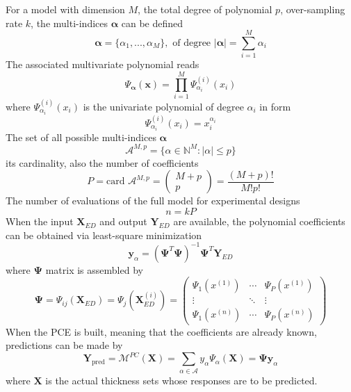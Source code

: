 For a model with dimension $M$, the total degree of polynomial $p$, over-sampling rate $k$, the multi-indices $\boldsymbol{\alpha}$ can be defined
\begin{equation}
    \boldsymbol{\alpha}=\{\alpha_1,...,\alpha_M\}, \text{ of degree }|\boldsymbol{\alpha}|=\sum_{i=1}^M \alpha_i  
\end{equation}
\noindent
The associated multivariate polynomial reads
\begin{equation}
    \Psi_{\boldsymbol{\alpha}}(\boldsymbol{x})=\prod_{i=1}^M\Psi_{\alpha_i}^{(i)}(x_i)
\end{equation}
\noindent
where $\Psi_{\alpha_i}^{(i)}(x_i)$ is the univariate polynomial of degree $\alpha_i$ in form
\begin{equation}
    \Psi_{\alpha_i}^{(i)}(x_i)=x_i^{\alpha_i}
\end{equation}
\noindent
The set of all possible multi-indices $\boldsymbol{\alpha}$
\begin{equation}
    \mathcal{A}^{M,p}=\{\alpha\in\mathbb{N}^M : |\alpha|\leq p\}
\end{equation}
its cardinality, also the number of coefficients
\begin{equation}
    P=\text{card }\mathcal{A}^{M,p}=\begin{pmatrix} M+p\\p\end{pmatrix}=\frac{(M+p)!}{M!p!}
\end{equation}
The number of evaluations of the full model for experimental designs
\begin{equation}
    n=kP
\end{equation}
When the input $\boldsymbol{X}_{ED}$ and output $\boldsymbol{Y}_{ED}$ are available, the polynomial coefficients can be obtained via least-square minimization 
\begin{equation}
    \boldsymbol{y}_{\alpha}=(\boldsymbol{\Psi}^T\boldsymbol{\Psi})^{-1}\boldsymbol{\Psi}^T\boldsymbol{Y}_{ED}
\end{equation}
\noindent
where $\boldsymbol{\Psi}$ matrix is assembled by
\begin{equation}
\label{eqn:Psi}
    \boldsymbol{\Psi}=\Psi_{ij}(\boldsymbol{X}_{ED})=\Psi_j(\boldsymbol{X}_{ED}^{(i)})=
    \begin{pmatrix}
    \Psi_1(x^{(1)})&\cdots&\Psi_P(x^{(1)})\\
    \vdots         &\ddots&\vdots\\
    \Psi_1(x^{(n)})&\cdots&\Psi_P(x^{(n)})
    \end{pmatrix}
\end{equation}
\noindent
When the PCE is built, meaning that the coefficients are already known, predictions can be made by
\begin{equation}
    \boldsymbol{Y}_{\text{pred}}=\mathcal{M}^{PC}(\boldsymbol{X})=\sum_{\alpha\in\mathcal{A}}y_{\alpha}\Psi_{\alpha}(\boldsymbol{X})=\boldsymbol{\Psi}\boldsymbol{y}_{\alpha}
\end{equation}
where $\boldsymbol{X}$ is the actual thickness sets whose responses are to be predicted.

